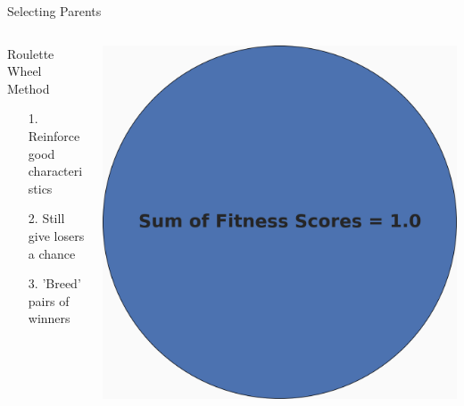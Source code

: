\documentclass[10pt]{beamer}
\begin{document}
{\begin{frame}{Selecting Parents}
	\begin{columns}[c] %
		\begin{column}{.48\textwidth}
			\begin{block}{Roulette Wheel Method}
    			\begin{itemize}[<+->]
    				\item[1.] {Reinforce good characteristics}
    				\item[2.] {Still give losers a chance}
    				\item[3.] {'Breed' pairs of winners}
    			\end{itemize}
			\end{block}
		\end{column}
		\hfill
		\begin{column}{0.48\textwidth}
		    \begin{overprint}
			    \includegraphics[width=\linewidth]{images/pie0.PNG}

\end{overprint}
\end{column}
\end{columns}
\end{frame}}
\end{document}
